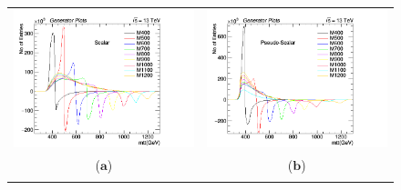 \documentclass{cmspaper}
\begin{document}
  
\begin{figure}[htp]
\centering
\begin{tabular}{cc}
\hspace{-0.5cm}
\includegraphics[scale=0.42]{genPlots/mtt_scalar.png}
& \hspace{-1.2cm} \includegraphics[scale=0.42]{genPlots/mtt_pscalar.png}\\
   ($\mathbf{a}$)\qquad\qquad&($\mathbf{b}$)\qquad\qquad\qquad\\
\hspace{-0.5cm}

\end{tabular}
\end{figure}
\end{document}
